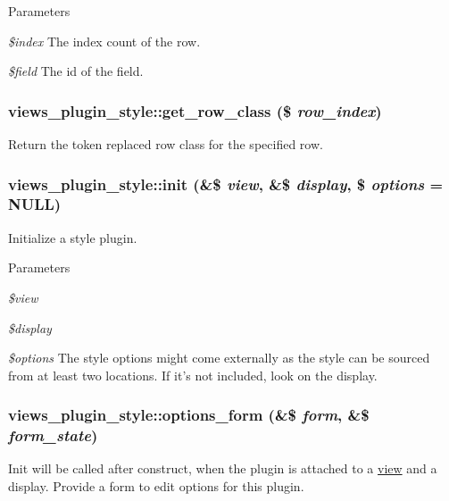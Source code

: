 \begin{DoxyParams}{Parameters}
\item[{\em \$index}]The index count of the row. \item[{\em \$field}]The id of the field. \end{DoxyParams}
\hypertarget{classviews__plugin__style_aa593397b4581d85a413699d7a084b663}{
\subsubsection[{get\_\-row\_\-class}]{\setlength{\rightskip}{0pt plus 5cm}views\_\-plugin\_\-style::get\_\-row\_\-class (\$ {\em row\_\-index})}}
\label{classviews__plugin__style_aa593397b4581d85a413699d7a084b663}
Return the token replaced row class for the specified row. \hypertarget{classviews__plugin__style_ab48326b2ea3d9bd9ad5fdf4f544c8eed}{
\subsubsection[{init}]{\setlength{\rightskip}{0pt plus 5cm}views\_\-plugin\_\-style::init (\&\$ {\em view}, \/  \&\$ {\em display}, \/  \$ {\em options} = {\ttfamily NULL})}}
\label{classviews__plugin__style_ab48326b2ea3d9bd9ad5fdf4f544c8eed}
Initialize a style plugin.


\begin{DoxyParams}{Parameters}
\item[{\em \$view}]\item[{\em \$display}]\item[{\em \$options}]The style options might come externally as the style can be sourced from at least two locations. If it's not included, look on the display. \end{DoxyParams}
\hypertarget{classviews__plugin__style_afe3d437ff4398315b15c4e60975dbb1c}{
\subsubsection[{options\_\-form}]{\setlength{\rightskip}{0pt plus 5cm}views\_\-plugin\_\-style::options\_\-form (\&\$ {\em form}, \/  \&\$ {\em form\_\-state})}}
\label{classviews__plugin__style_afe3d437ff4398315b15c4e60975dbb1c}
Init will be called after construct, when the plugin is attached to a \hyperlink{classview}{view} and a display. Provide a form to edit options for this plugin. 

